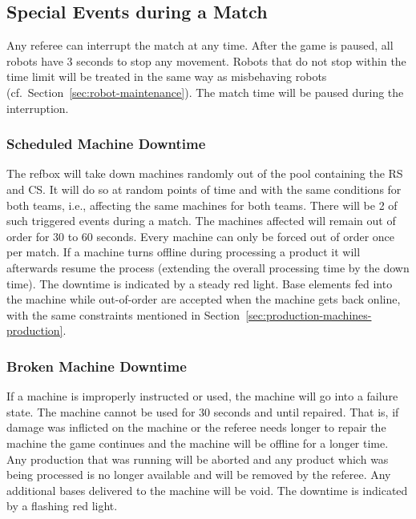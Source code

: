 \documentclass[12pt,twoside]{article}
\newcommand{\refsec}[1]{Section~\ref{#1}}
\begin{document}
\subsection{Special Events during a Match}
\label{sec:during-match}
Any referee can interrupt the match at any time. After the game is
paused, all robots have 3 seconds to stop any movement.  Robots that
do not stop within the time limit will be treated in the same way as
misbehaving robots (cf.~\refsec{sec:robot-maintenance}).  The match
time will be paused during the interruption.

\subsubsection{Scheduled Machine Downtime}
\label{sec:out-of-order}
The refbox will take down machines randomly out of the pool containing
the RS and CS. It will do so at random points of time and with the
same conditions for both teams, i.e., affecting the same machines for
both teams. There will be 2 of such triggered events during a
match. The machines affected will remain out of order for 30 to 60
seconds. Every machine can only be forced out of order once per
match. If a machine turns offline during processing a product it will
afterwards resume the process (extending the overall processing time
by the down time). The downtime is indicated by a steady red
light. Base elements fed into the machine while out-of-order are
accepted when the machine gets back online, with the same constraints
mentioned in \refsec{sec:production-machines-production}.

\subsubsection{Broken Machine Downtime}
\label{sec:broken-machine}
If a machine is improperly instructed or used, the machine will go
into a failure state. The machine cannot be used for 30 seconds and
until repaired. That is, if damage was inflicted on the machine or the
referee needs longer to repair the machine the game continues and the
machine will be offline for a longer time. Any production that was
running will be aborted and any product which was being processed is
no longer available and will be removed by the referee. Any additional
bases delivered to the machine will be void. The downtime is indicated
by a flashing red light.
\end{document}
